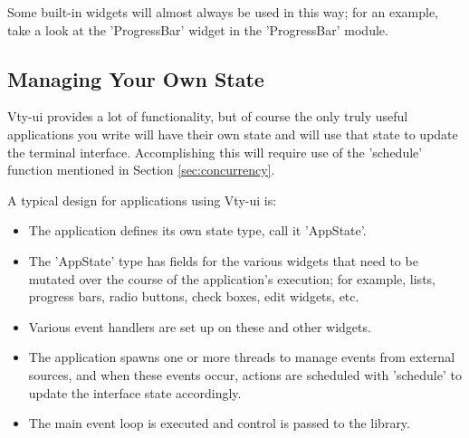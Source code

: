 Some built-in widgets will almost always be used in this way; for an
example, take a look at the 'ProgressBar' widget in the 'ProgressBar'
module.

\subsection{Managing Your Own State}

Vty-ui provides a lot of functionality, but of course the only truly
useful applications you write will have their own state and will use
that state to update the terminal interface.  Accomplishing this will
require use of the 'schedule' function mentioned in Section
\ref{sec:concurrency}.

A typical design for applications using Vty-ui is:

\begin{itemize}
\item The application defines its own state type, call it 'AppState'.
\item The 'AppState' type has fields for the various widgets that need
  to be mutated over the course of the application's execution; for
  example, lists, progress bars, radio buttons, check boxes, edit
  widgets, etc.
\item Various event handlers are set up on these and other widgets.
\item The application spawns one or more threads to manage events from
  external sources, and when these events occur, actions are scheduled
  with 'schedule' to update the interface state accordingly.
\item The main event loop is executed and control is passed to the
  library.
\end{itemize}
